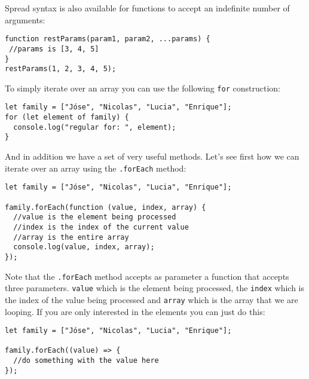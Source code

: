 \documentclass[a4paper, oneside, titlepage, 12pt]{book}
\begin{document}
Spread syntax is also available for functions to accept an indefinite number of arguments:

\begin{verbatim}
function restParams(param1, param2, ...params) {
 //params is [3, 4, 5]	
}
restParams(1, 2, 3, 4, 5);
\end{verbatim}

To simply iterate over an array you can use the following \texttt{for} construction: 

\begin{verbatim}
let family = ["Jóse", "Nicolas", "Lucia", "Enrique"];
for (let element of family) {
  console.log("regular for: ", element);
}
\end{verbatim}
               
And in addition we have a set of very useful methods. Let's see first how we can iterate over an array using the \texttt{.forEach} method:               
               
\begin{verbatim}
let family = ["Jóse", "Nicolas", "Lucia", "Enrique"];

family.forEach(function (value, index, array) {
  //value is the element being processed
  //index is the index of the current value
  //array is the entire array
  console.log(value, index, array);
});
\end{verbatim}

Note that the \texttt{.forEach} method accepts as parameter a function that accepts three parameters. \texttt{value} which is the element being processed, the \texttt{index} which is the index of the value being processed and \texttt{array} which is the array that we are looping. If you are only interested in the elements you can just do this:

\begin{verbatim}
let family = ["Jóse", "Nicolas", "Lucia", "Enrique"];

family.forEach((value) => {
  //do something with the value here	
});
\end{verbatim}
\end{document}
